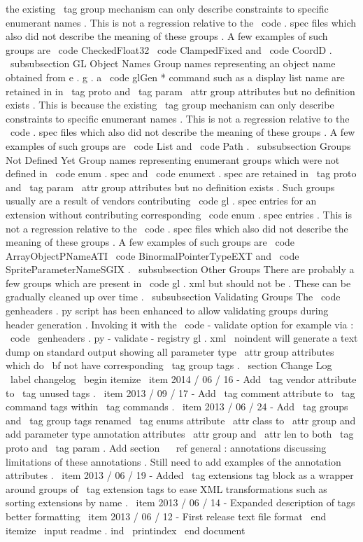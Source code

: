 the
existing
\
tag
{
group
}
mechanism
can
only
describe
constraints
to
specific
enumerant
names
.
This
is
not
a
regression
relative
to
the
\
code
{
.
spec
}
files
which
also
did
not
describe
the
meaning
of
these
groups
.
A
few
examples
of
such
groups
are
\
code
{
CheckedFloat32
}
\
code
{
ClampedFixed
}
and
\
code
{
CoordD
}
.
\
subsubsection
{
GL
Object
Names
}
Group
names
representing
an
object
name
obtained
from
e
.
g
.
a
\
code
{
glGen
*
}
command
such
as
a
display
list
name
are
retained
in
in
\
tag
{
proto
}
and
\
tag
{
param
}
\
attr
{
group
}
attributes
but
no
definition
exists
.
This
is
because
the
existing
\
tag
{
group
}
mechanism
can
only
describe
constraints
to
specific
enumerant
names
.
This
is
not
a
regression
relative
to
the
\
code
{
.
spec
}
files
which
also
did
not
describe
the
meaning
of
these
groups
.
A
few
examples
of
such
groups
are
\
code
{
List
}
and
\
code
{
Path
}
.
\
subsubsection
{
Groups
Not
Defined
Yet
}
Group
names
representing
enumerant
groups
which
were
not
defined
in
\
code
{
enum
.
spec
}
and
\
code
{
enumext
.
spec
}
are
retained
in
\
tag
{
proto
}
and
\
tag
{
param
}
\
attr
{
group
}
attributes
but
no
definition
exists
.
Such
groups
usually
are
a
result
of
vendors
contributing
\
code
{
gl
.
spec
}
entries
for
an
extension
without
contributing
corresponding
\
code
{
enum
.
spec
}
entries
.
This
is
not
a
regression
relative
to
the
\
code
{
.
spec
}
files
which
also
did
not
describe
the
meaning
of
these
groups
.
A
few
examples
of
such
groups
are
\
code
{
ArrayObjectPNameATI
}
\
code
{
BinormalPointerTypeEXT
}
and
\
code
{
SpriteParameterNameSGIX
}
.
\
subsubsection
{
Other
Groups
}
There
are
probably
a
few
groups
which
are
present
in
\
code
{
gl
.
xml
}
but
should
not
be
.
These
can
be
gradually
cleaned
up
over
time
.
\
subsubsection
{
Validating
Groups
}
The
\
code
{
genheaders
.
py
}
script
has
been
enhanced
to
allow
validating
groups
during
header
generation
.
Invoking
it
with
the
\
code
{
-
validate
}
option
for
example
via
:
\
code
{
\
genheaders
.
py
-
validate
-
registry
gl
.
xml
}
\
noindent
will
generate
a
text
dump
on
standard
output
showing
all
parameter
type
\
attr
{
group
}
attributes
which
do
{
\
bf
not
}
have
corresponding
\
tag
{
group
}
tags
.
\
section
{
Change
Log
}
\
label
{
changelog
}
\
begin
{
itemize
}
\
item
2014
/
06
/
16
-
Add
\
tag
{
vendor
}
attribute
to
\
tag
{
unused
}
tags
.
\
item
2013
/
09
/
17
-
Add
\
tag
{
comment
}
attribute
to
\
tag
{
command
}
tags
within
\
tag
{
commands
}
.
\
item
2013
/
06
/
24
-
Add
\
tag
{
groups
}
and
\
tag
{
group
}
tags
renamed
\
tag
{
enums
}
attribute
\
attr
{
class
}
to
\
attr
{
group
}
and
add
parameter
type
annotation
attributes
\
attr
{
group
}
and
\
attr
{
len
}
to
both
\
tag
{
proto
}
and
\
tag
{
param
}
.
Add
section
~
\
ref
{
general
:
annotations
}
discussing
limitations
of
these
annotations
.
Still
need
to
add
examples
of
the
annotation
attributes
.
\
item
2013
/
06
/
19
-
Added
\
tag
{
extensions
}
tag
block
as
a
wrapper
around
groups
of
\
tag
{
extension
}
tags
to
ease
XML
transformations
such
as
sorting
extensions
by
name
.
\
item
2013
/
06
/
14
-
Expanded
description
of
tags
better
formatting
\
item
2013
/
06
/
12
-
First
release
text
file
format
\
end
{
itemize
}
\
input
{
readme
.
ind
}
%
\
printindex
\
end
{
document
}
